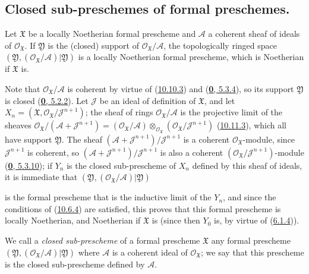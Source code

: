 \subsection{Closed sub-preschemes of formal preschemes.}
\label{subsection:I.10.14}

\begin{proposition}[10.14.1]
\label{I.10.14.1}
Let $\mathfrak{X}$ be a locally Noetherian formal prescheme and
$\mathscr{A}$ a coherent sheaf of ideals of
$\mathscr{O}_{\mathfrak{X}}$. If $\mathfrak{Y}$ is the (closed) support of
$\mathscr{O}_{\mathfrak{X}}/\mathscr{A}$, the topologically ringed space
$(\mathfrak{Y},(\mathscr{O}_{\mathfrak{X}}/\mathscr{A})|\mathfrak{Y})$ is
a locally Noetherian formal prescheme, which is Noetherian if
$\mathfrak{X}$ is.
\end{proposition}

Note that $\mathscr{O}_{\mathfrak{X}}/\mathscr{A}$ is coherent by virtue of
(\hyperref[I.10.10.3]{10.10.3}) and
(\hyperref[0.5.3.4]{\textbf{0}, 5.3.4}), so its support $\mathfrak{Y}$ is closed
(\hyperref[0.5.2.2]{\textbf{0}, 5.2.2}). Let $\mathscr{J}$ be an ideal of definition
of $\mathfrak{X}$, and let
$X_n=(\mathfrak{X},\mathscr{O}_{\mathfrak{X}}/\mathscr{J}^{n+1})$; the
sheaf of rings $\mathscr{O}_{\mathfrak{X}}/\mathscr{A}$ is the projective
limit of the sheaves
$\mathscr{O}_{\mathfrak{X}}/(\mathscr{A}+\mathscr{J}^{n+1})
=(\mathscr{O}_{\mathfrak{X}}/\mathscr{A})
\otimes_{\mathscr{O}_{\mathfrak{X}}}
(\mathscr{O}_{\mathfrak{X}}/\mathscr{J}^{n+1})$
(\hyperref[I.10.11.3]{10.11.3}), which all have support
$\mathfrak{Y}$. The sheaf
$(\mathscr{A}+\mathscr{J}^{n+1})/\mathscr{J}^{n+1}$ is a
coherent $\mathscr{O}_{\mathfrak{X}}$-module, since
$\mathscr{J}^{n+1}$ is coherent, so
$(\mathscr{A}+\mathscr{J}^{n+1})/\mathscr{J}^{n+1}$ is also a
coherent $(\mathscr{O}_{\mathfrak{X}}/\mathscr{J}^{n+1})$-module
(\hyperref[0.5.3.10]{\textbf{0}, 5.3.10}); if $Y_n$ is the closed sub-prescheme
of $X_n$ defined by this sheaf of ideals, it is immediate that
$(\mathfrak{Y},(\mathscr{O}_{\mathfrak{X}}/\mathscr{A})|\mathfrak{Y})$

is the formal prescheme that is the inductive limit of the $Y_n$, and since
the conditions of (\hyperref[I.10.6.4]{10.6.4}) are satisfied, this proves
that this formal prescheme is locally Noetherian, and Noetherian if
$\mathfrak{X}$ is (since then $Y_0$ is, by virtue of
(\hyperref[I.6.1.4]{6.1.4})).

\begin{definition}[10.14.2]
\label{I.10.14.2}
We call a \emph{closed sub-prescheme} of a formal prescheme $\mathfrak{X}$
any formal prescheme
$(\mathfrak{Y},(\mathscr{O}_{\mathfrak{X}}/\mathscr{A})|\mathfrak{Y})$ where
$\mathscr{A}$ is a coherent ideal of $\mathscr{O}_{\mathfrak{X}}$; we say that
this prescheme is the closed sub-prescheme defined by $\mathscr{A}$.
\end{definition}

